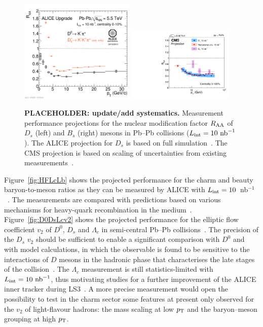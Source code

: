 \begin{figure}[ht]
\centering
\includegraphics[width=0.49\textwidth]{hf/figures/2013-Oct-24-D0DsRAAprompt_TDR_logo.pdf}
\includegraphics[width=0.45\textwidth]{hf/figures/CMS_B_Bs_RAA.pdf}
\caption{{\bf PLACEHOLDER: update/add systematics.} Measurement performance projections for the nuclear modification factor  $R_{\rm AA}$ of $D_s$ (left) and $B_s$ (right) mesons in Pb--Pb collisions ($L_{\rm int }=10~{\rm nb}^{-1}$). The ALICE projection for $D_s$ is based on full simulation~\cite{ITSTDR}. The CMS projection is based on scaling of uncertainties from existing measurements~\cite{CMSFTR2017}.}
\label{fig:HFDsBs}
\end {figure}

Figure~\ref{fig:HFLcLb} shows the projected performance for the charm and beauty baryon-to-meson ratios as they can be measured by ALICE with $L_{\rm int}=10$~nb$^{-1}$~\cite{ITSTDR}. The measurements are compared with predictions based on various mechanisms for heavy-quark recombination in the medium~\cite{Catania,TAMU,Ko}.
Figure~\ref{fig:D0DsLcv2} shows the projected performance for the elliptic flow coefficient $v_2$ of $D^0$, $D_s$ and $\Lambda_c$ 
in semi-central Pb--Pb collisions~\cite{ITSTDR}. The precision of the $D_s$ $v_2$ should be sufficient to enable a significant comparison with $D^0$ and with model calculations, in which the 
observable is found to be sensitive to the interactions of $D$ mesons in the hadronic phase that characterises the late stages of the collision~\cite{RappDs}. 
The $\Lambda_c$ measurement is still statistics-limited with $L_{\rm int}=10~{\rm nb}^{-1}$, thus motivating studies for a further improvement of the ALICE inner tracker during LS3~\cite{ALICEITS3}.  A more precise measurement would open the possibility to test in the charm sector some features at present only observed for the $v_2$ of light-flavour hadrons: the mass scaling at low $p_{\rm T}$ and 
the baryon--meson grouping at high $p_{\rm T}$.


